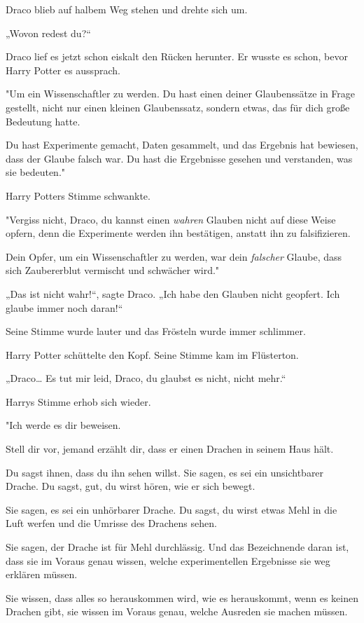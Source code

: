 {Draco blieb auf halbem Weg stehen und drehte sich um.

„Wovon redest du?“

Draco lief es jetzt schon eiskalt den Rücken herunter. Er wusste es schon, bevor Harry Potter es aussprach.

"Um ein Wissenschaftler zu werden. Du hast einen deiner Glaubenssätze in Frage gestellt, nicht nur einen kleinen Glaubenssatz, sondern etwas, das für dich große Bedeutung hatte.

Du hast Experimente gemacht, Daten gesammelt, und das Ergebnis hat bewiesen, dass der Glaube falsch war. Du hast die Ergebnisse gesehen und verstanden, was sie bedeuten."

Harry Potters Stimme schwankte.

"Vergiss nicht, Draco, du kannst einen \emph{wahren} Glauben nicht auf diese Weise opfern, denn die Experimente werden ihn bestätigen, anstatt ihn zu falsifizieren.

Dein Opfer, um ein Wissenschaftler zu werden, war dein \emph{falscher} Glaube, dass sich Zaubererblut vermischt und schwächer wird."

„Das ist nicht wahr!“, sagte Draco. „Ich habe den Glauben nicht geopfert. Ich glaube immer noch daran!“

Seine Stimme wurde lauter und das Frösteln wurde immer schlimmer.

Harry Potter schüttelte den Kopf. Seine Stimme kam im Flüsterton.

„Draco… Es tut mir leid, Draco, du glaubst es nicht, nicht mehr.“

Harrys Stimme erhob sich wieder.

"Ich werde es dir beweisen.

Stell dir vor, jemand erzählt dir, dass er einen Drachen in seinem Haus hält.

Du sagst ihnen, dass du ihn sehen willst. Sie sagen, es sei ein unsichtbarer Drache. Du sagst, gut, du wirst hören, wie er sich bewegt.

Sie sagen, es sei ein unhörbarer Drache. Du sagst, du wirst etwas Mehl in die Luft werfen und die Umrisse des Drachens sehen.

Sie sagen, der Drache ist für Mehl durchlässig. Und das Bezeichnende daran ist, dass sie im Voraus genau wissen, welche experimentellen Ergebnisse sie weg erklären müssen.

Sie wissen, dass alles so herauskommen wird, wie es herauskommt, wenn es keinen Drachen gibt, sie wissen im Voraus genau, welche Ausreden sie machen müssen.

}
